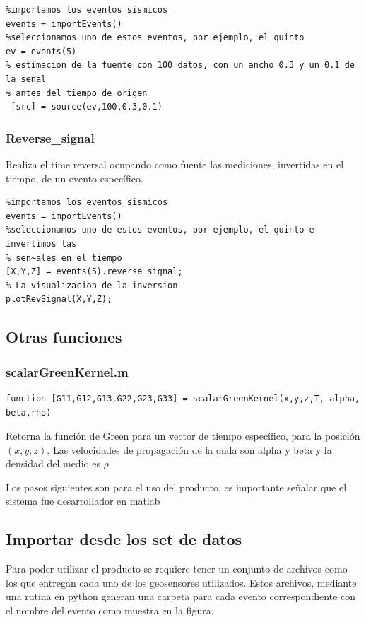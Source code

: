\begin{verbatim}
%importamos los eventos sismicos
events = importEvents()
%seleccionamos uno de estos eventos, por ejemplo, el quinto
ev = events(5)
% estimacion de la fuente con 100 datos, con un ancho 0.3 y un 0.1 de la senal
% antes del tiempo de origen
 [src] = source(ev,100,0.3,0.1)
\end{verbatim}

\subsubsection{Reverse\_signal}
Realiza el time reversal ocupando como fuente las mediciones, invertidas en
el tiempo, de un evento específico.
\begin{verbatim}
%importamos los eventos sismicos
events = importEvents()
%seleccionamos uno de estos eventos, por ejemplo, el quinto e invertimos las
% sen~ales en el tiempo
[X,Y,Z] = events(5).reverse_signal;
% La visualizacion de la inversion
plotRevSignal(X,Y,Z);
\end{verbatim}

\subsection{Otras funciones}
\subsubsection{scalarGreenKernel.m}
\begin{verbatim}
function [G11,G12,G13,G22,G23,G33] = scalarGreenKernel(x,y,z,T, alpha, beta,rho)
\end{verbatim}
Retorna la función de Green para un vector de tiempo específico, para la
posici\'on $(x,y,z)$. Las velocidades de propagación de la onda son alpha y beta
y la densidad del medio es $\rho$.

Los pasos siguientes son para el uso del producto, es importante señalar que el
sistema fue desarrollador en matlab
\subsection{Importar desde los set de datos}

Para poder utilizar el producto se requiere tener un conjunto de archivos como 
los que entregan cada uno de los geosensores utilizados. Estos archivos,
mediante una rutina en python generan una carpeta para cada evento correspondiente con el 
nombre del evento como muestra en la figura.

